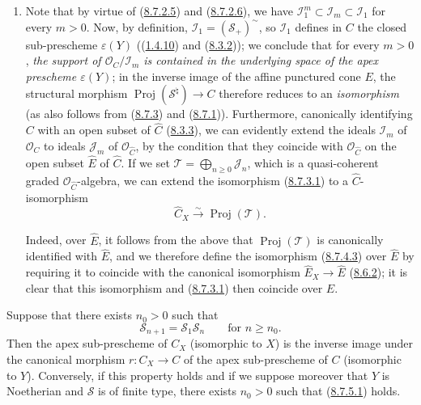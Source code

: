 \begin{remark}[8.7.4]
\begin{enumerate}
  \item[\rm{(ii)}] Note that by virtue of
  (\hyperref[II.8.7.2.5]{8.7.2.5}) and
  (\hyperref[II.8.7.2.6]{8.7.2.6}), we have
  $\mathcal{I}_1^m\subset\mathcal{I}_m\subset\mathcal{I}_1$ for every $m>0$.
  Now, by definition, $\mathcal{I}_1=(\mathcal{S}_+)^{\sim}$, so
  $\mathcal{I}_1$ defines in $C$ the closed sub-prescheme
  $\varepsilon(Y)$ ((\hyperref[II.1.4.10]{1.4.10}) and
  (\hyperref[II.8.3.2]{8.3.2})); we conclude that for every $m>0$,
  \emph{the support of $\mathcal{O}_C/\mathcal{I}_m$ is contained in the
  underlying space of the apex prescheme $\varepsilon(Y)$}; in the inverse
  image of the affine punctured cone $E$, the structural morphism
  $\operatorname{Proj}(\mathcal{S}^{\natural})\to C$ therefore reduces to an
  \emph{isomorphism} (as also follows from
  (\hyperref[II.8.7.3]{8.7.3}) and
  (\hyperref[II.8.7.1]{8.7.1})). Furthermore, canonically identifying $C$
  with an open subset of $\widehat{C}$ (\hyperref[II.8.3.3]{8.3.3}), we can
  evidently extend the ideals $\mathcal{I}_m$ of $\mathcal{O}_C$ to
  ideals $\mathcal{J}_m$ of $\mathcal{O}_{\widehat{C}}$, by the condition that
  they coincide with $\mathcal{O}_{\widehat{C}}$ on the open subset
  $\widehat{E}$ of $\widehat{C}$. If we set
  $\mathcal{T}=\bigoplus_{n\geqslant 0}\mathcal{J}_n$, which is a
  quasi-coherent graded $\mathcal{O}_{\widehat{C}}$-algebra, we can
  extend the isomorphism (\hyperref[II.8.7.3.1]{8.7.3.1}) to a
  $\widehat{C}$-isomorphism
  \begin{equation}
  \label{II.8.7.4.3}
    \widehat{C}_X\xrightarrow{\sim}\operatorname{Proj}(\mathcal{T}).
  \tag{8.7.4.3}
  \end{equation}

  Indeed, over $\widehat{E}$, it follows from the above that
  $\operatorname{Proj}(\mathcal{T})$ is canonically identified with
  $\widehat{E}$, and we therefore define the isomorphism
  (\hyperref[II.8.7.4.3]{8.7.4.3}) over $\widehat{E}$ by requiring
  it to coincide with the canonical isomorphism
  $\widehat{E}_X\to\widehat{E}$ (\hyperref[II.8.6.2]{8.6.2}); it is clear
  that this isomorphism and (\hyperref[II.8.7.3.1]{8.7.3.1}) then coincide
  over $E$.
\end{enumerate}
\end{remark}

\begin{corollary}[8.7.5]
\label{II.8.7.5}
Suppose that there exists $n_0>0$ such that
\begin{equation}
\label{II.8.7.5.1}
  \mathcal{S}_{n+1}=\mathcal{S}_1\mathcal{S}_n
  \qquad\text{for }n\geqslant n_0.
\tag{8.7.5.1}
\end{equation}
Then the apex sub-prescheme of $C_X$ (isomorphic to $X$) is the inverse
image under the canonical morphism $r:C_X\to C$ of the apex sub-prescheme
of $C$ (isomorphic to $Y$). Conversely, if this property holds and if we
suppose moreover that $Y$ is Noetherian and $\mathcal{S}$ is of finite type,
there exists $n_0>0$ such that (\hyperref[II.8.7.5.1]{8.7.5.1}) holds.
\end{corollary}

